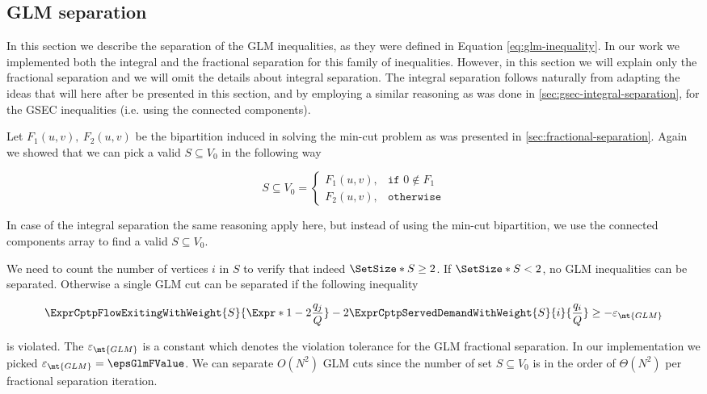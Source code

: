 \subsection{GLM separation}
\label{sec:impl-glm-separation}

In this section we describe the separation of the GLM inequalities, as they were defined in Equation \eqref{eq:glm-inequality}.
In our work we implemented both the integral and the fractional separation for this family of inequalities.
However, in this section we will explain only the fractional separation and we will omit the details about integral separation.
The integral separation follows naturally from adapting the ideas that will here after be presented in this section, and by employing a similar reasoning as was done in \cref{sec:gsec-integral-separation}, for the GSEC inequalities (i.e. using the connected components).

Let $F_1(u, v),\ F_2(u, v)$ be the bipartition induced in solving the min-cut problem as was presented in \cref{sec:fractional-separation}.
Again we showed that we can pick a valid $S \subseteq V_0$ in the following way

\begin{equation}
	S \subseteq V_0 =
	\begin{cases}
		F_1(u, v), & \texttt{if } 0 \notin F_1 \\
		F_2(u, v), & \texttt{otherwise}
	\end{cases}
\end{equation}

In case of the integral separation the same reasoning apply here, but instead of using the min-cut bipartition, we use the connected components array to find a valid $S \subseteq V_0$.

We need to count the number of vertices $i$ in $S$ to verify that indeed $\SetSize*{S} \ge 2$.
If $\SetSize*{S} < 2$, no GLM inequalities can be separated.
Otherwise a single GLM cut can be separated if the following inequality

\begin{equation}
	\begin{split}
		\ExprCptpFlowExitingWithWeight{S}{\Expr*{1 - 2 \frac{q_j}{Q}}} - 2 	\ExprCptpServedDemandWithWeight{S}{i}{\frac{q_i}{Q}} \ge - \varepsilon_{\mt{GLM}}
	\end{split}
\end{equation}

is violated.
The $\varepsilon_{\mt{GLM}}$ is a constant which denotes the violation tolerance for the GLM fractional separation.
In our implementation we picked $\varepsilon_{\mt{GLM}} = \epsGlmFValue$.
We can separate $O(N^2)$ GLM cuts since the number of set $S \subseteq V_0$ is in the order of $\Theta(N^2)$ per fractional separation iteration.

